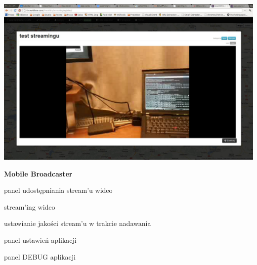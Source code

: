 \begin{packed_item}
{        \begin{center}
            \includegraphics[width=\textwidth]{img/screens/interfejs_www/browser-receiver.jpg}
        \end{center}
    }
\end{packed_item}

\newpage
\textbf{Mobile Broadcaster}
\begin{packed_item}
    \item{panel udostępniania stream'u wideo}
    \item{stream'ing wideo}
    \item{ustawianie jakości stream'u w trakcie nadawania}
    \item{panel ustawień aplikacji}
    \item{panel DEBUG aplikacji}
\end{packed_item}


